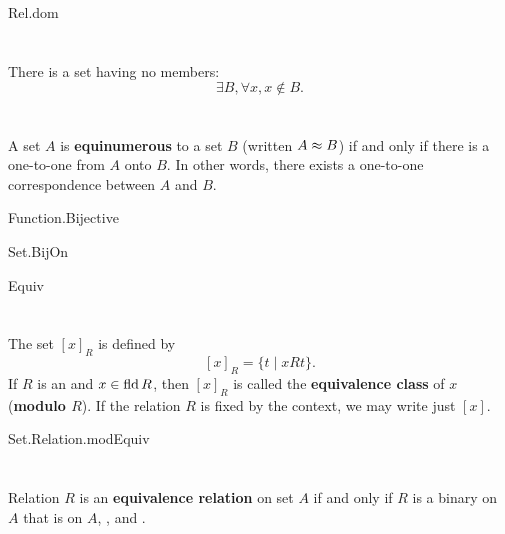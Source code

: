 \documentclass{report}
\begin{document}
    {Rel.dom}

\section{}%

  There is a set having no members: $$\exists B, \forall x, x \not\in B.$$


\section{}%

  A set $A$ is \textbf{equinumerous} to a set $B$ (written $A \approx B$) if and
    only if there is a one-to-one  from $A$ onto $B$.
  In other words, there exists a one-to-one correspondence between $A$ and $B$.

    {Function.Bijective}

    {Set.BijOn}

    {Equiv}

\section{}%

  The set $[x]_R$ is defined by $$[x]_R = \{t \mid xRt\}.$$
  If $R$ is an  and $x \in \mathop{\text{fld}}{R}$, then
    $[x]_R$ is called the \textbf{equivalence class} of $x$
    (\textbf{modulo $R$}).
  If the relation $R$ is fixed by the context, we may write just $[x]$.

    {Set.Relation.modEquiv}

\section{}%

  Relation $R$ is an \textbf{equivalence relation} on set $A$ if and only if
    $R$ is a binary  on $A$ that is
     on $A$, , and
    .
\end{document}
